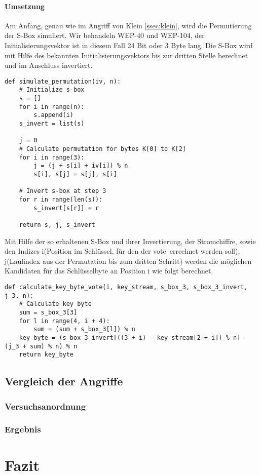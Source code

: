 \documentclass[10pt,a4paper]{article}
\begin{document}
\paragraph{Umsetzung}
Am Anfang, genau wie im Angriff von Klein \ref{ssec:klein}, wird die Permutierung der S-Box simuliert. Wir behandeln WEP-40 und WEP-104, der Initialisierungsvektor ist in diesem Fall 24 Bit oder 3 Byte lang. Die S-Box wird mit Hilfe des bekannten Initialisierungsvektors bis zur dritten Stelle berechnet und im Anschluss invertiert.
\begin{lstlisting}
def simulate_permutation(iv, n):
    # Initialize s-box
    s = []
    for i in range(n):
        s.append(i)
    s_invert = list(s)

    j = 0
    # Calculate permutation for bytes K[0] to K[2]
    for i in range(3):
        j = (j + s[i] + iv[i]) % n
        s[i], s[j] = s[j], s[i]

    # Invert s-box at step 3
    for r in range(len(s)):
        s_invert[s[r]] = r

    return s, j, s_invert
\end{lstlisting}
Mit Hilfe der so erhaltenen S-Box und ihrer Invertierung, der Stromchiffre, sowie den Indizes i(Position im Schlüssel, für den der \glqq vote\grqq\ errechnet werden soll), j(Laufindex aus der Permutation bis zum dritten Schritt) werden die möglichen Kandidaten für das Schlüsselbyte an Position i wie folgt berechnet.
\begin{lstlisting}
def calculate_key_byte_vote(i, key_stream, s_box_3, s_box_3_invert, j_3, n):
    # Calculate key byte
    sum = s_box_3[3]
    for l in range(4, i + 4):
        sum = (sum + s_box_3[l]) % n
    key_byte = (s_box_3_invert[((3 + i) - key_stream[2 + i]) % n] - (j_3 + sum) % n) % n
    return key_byte
\end{lstlisting}

\subsection{Vergleich der Angriffe}
\label{ssec:vergleich}

\subsubsection{Versuchsanordnung}


\subsubsection{Ergebnis}

\section{Fazit}
\newpage
\nocite{*}
\printbibliography
\end{document}
